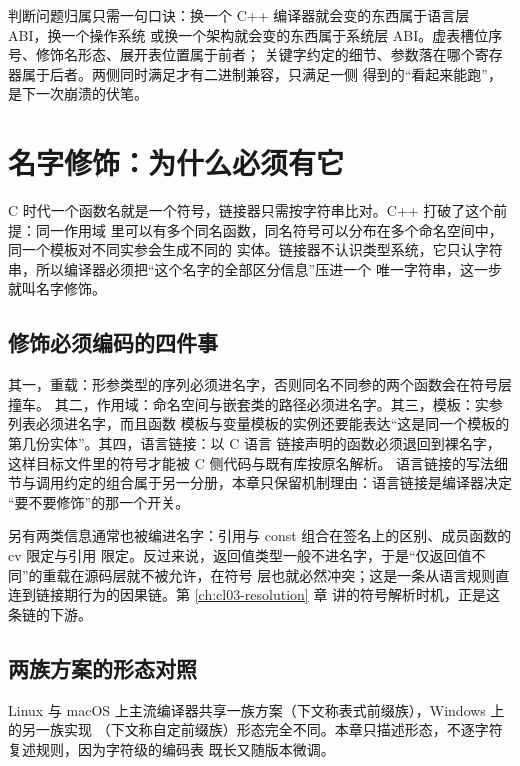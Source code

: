 \documentclass[12pt,a4paper,fontset=fandol]{ctexbook}
\newcommand{\Lang}[1]{\textsf{#1}}
\newcommand{\CL}{\Lang{C}}
\newcommand{\CPP}{\Lang{C++}}
\newcommand{\Nix}{\textsf{Linux}}
\newcommand{\Win}{\textsf{Windows}}
\newcommand{\Mac}{\textsf{macOS}}
\begin{document}
\begin{guideline}[title={本章与调用约定章的分界线}]
判断问题归属只需一句口诀：换一个 \CPP{} 编译器就会变的东西属于语言层 ABI，换一个操作系统
或换一个架构就会变的东西属于系统层 ABI。虚表槽位序号、修饰名形态、展开表位置属于前者；
关键字约定的细节、参数落在哪个寄存器属于后者。两侧同时满足才有二进制兼容，只满足一侧
得到的“看起来能跑”，是下一次崩溃的伏笔。
\end{guideline}

\section{名字修饰：为什么必须有它}\label{sec:cl13-mangling}

\CL{} 时代一个函数名就是一个符号，链接器只需按字符串比对。\CPP{} 打破了这个前提：同一作用域
里可以有多个同名函数，同名符号可以分布在多个命名空间中，同一个模板对不同实参会生成不同的
实体。链接器不认识类型系统，它只认字符串，所以编译器必须把“这个名字的全部区分信息”压进一个
唯一字符串，这一步就叫名字修饰。

\subsection{修饰必须编码的四件事}\label{sec:cl13-mangling-input}

其一，重载：形参类型的序列必须进名字，否则同名不同参的两个函数会在符号层撞车。
其二，作用域：命名空间与嵌套类的路径必须进名字。其三，模板：实参列表必须进名字，而且函数
模板与变量模板的实例还要能表达“这是同一个模板的第几份实体”。其四，语言链接：以 \CL{} 语言
链接声明的函数必须退回到裸名字，这样目标文件里的符号才能被 \CL{} 侧代码与既有库按原名解析。
语言链接的写法细节与调用约定的组合属于另一分册，本章只保留机制理由：语言链接是编译器决定
“要不要修饰”的那一个开关。

另有两类信息通常也被编进名字：引用与 const 组合在签名上的区别、成员函数的 cv 限定与引用
限定。反过来说，返回值类型一般不进名字，于是“仅返回值不同”的重载在源码层就不被允许，在符号
层也就必然冲突；这是一条从语言规则直连到链接期行为的因果链。第 \ref{ch:cl03-resolution} 章
讲的符号解析时机，正是这条链的下游。

\subsection{两族方案的形态对照}\label{sec:cl13-mangling-families}

\Nix{} 与 \Mac{} 上主流编译器共享一族方案（下文称表式前缀族），\Win{} 上的另一族实现
（下文称自定前缀族）形态完全不同。本章只描述形态，不逐字符复述规则，因为字符级的编码表
既长又随版本微调。
\end{document}
